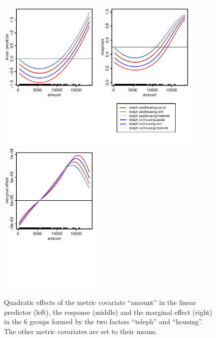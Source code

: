 \documentclass[nojss]{jss}
\newcommand{\quotes}[1]{``#1''}
\begin{document}
\begin{figure}[ht]
\centering
\includegraphics[width=5cm]{cd-amount-link} \includegraphics[width=5cm]{cd-amount-resp} \includegraphics[width=5cm]{cd-amount-marg}
\vspace{-0.75cm}
\caption{Quadratic effects of the metric covariate \quotes{amount} in the linear predictor (left), the response (middle) and the marginal effect (right) in the 6 groups formed by the two factors \quotes{teleph} and \quotes{housing}. The other metric covariates are set to their means.} \label{fig-cd-amount}
\end{figure}
\end{document}
